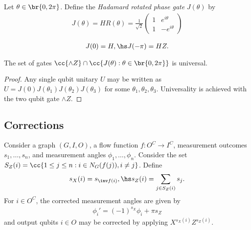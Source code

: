 \documentclass{article}
\begin{document}
\begin{definition}
  Let $\theta\in\br{0,2\pi}$. Define the \emph{Hadamard rotated
  phase gate} $J(\theta)$ by
  \begin{align*}
    J(\theta) = HR(\theta) = \frac{1}{\sqrt{2}}\begin{pmatrix}
      1 & e^{i\theta} \\
      1 & -e^{i\theta}
    \end{pmatrix}
  \end{align*}
\end{definition}

\begin{lemma}
  \begin{align*}
    J(0) = H, \hs J(-\pi) = HZ.
  \end{align*}
\end{lemma}

\begin{theorem}
  The set of gates $\cc{\wedge Z}\cap\cc{J(\theta) : \theta\in\br{0,2\pi}}$
  is universal.
  \begin{proof}
    Any single qubit unitary $U$ may be written as
    $U=J(0)J(\theta_1)J(\theta_2)J(\theta_3)$ for some
    $\theta_1,\theta_2,\theta_3$.
    Universality is achieved with the two qubit gate $\wedge Z$.
  \end{proof}
\end{theorem}


\subsection{Corrections}

\begin{theorem}
  Consider a graph $(G,I,O)$, a flow function $f:O^C\to I^C$, measurement
  outcomes $s_1,\ldots,s_n$, and measurement angles $\phi_1,\ldots,\phi_n$.
  Consider the set $S_Z(i) = \cc{1\leq j\leq n : i\in N_G(f(j)), i\neq j}$.
  Define
  \begin{align*}
    s_X(i) = s_{\inv f(i)}, \hs s_Z(i) = \sum_{j\in S_Z(i)} s_j.
  \end{align*}
  For $i\in O^C$, the corrected measurement angles are given by
  \begin{align*}
    \phi_i' = (-1)^{s_X}\phi_i + \pi s_Z
  \end{align*}
  and output qubits $i\in O$ may be corrected by applying
  $X^{s_X(i)}Z^{s_Z(i)}$.
\end{theorem}
\end{document}
